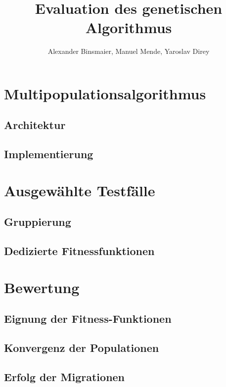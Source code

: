 \documentclass[12pt,a4paper]{article}
\author{Alexander Binsmaier, Manuel Mende, Yaroslav Direy}
\title{Evaluation des genetischen Algorithmus}
\begin{document}
\maketitle
\tableofcontents

\section{Multipopulationsalgorithmus}
\subsection{Architektur}
\subsection{Implementierung}

\section{Ausgewählte Testfälle}
\subsection{Gruppierung}
\subsection{Dedizierte Fitnessfunktionen}

\section{Bewertung}
\subsection{Eignung der Fitness-Funktionen}
\subsection{Konvergenz der Populationen}
\subsection{Erfolg der Migrationen}
\end{document}
